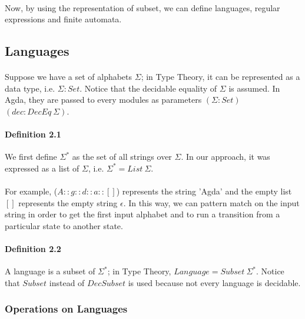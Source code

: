 \paragraph{}

\paragraph{} Now, by using the representation of subset, we can define languages, regular expressions and finite
automata. 

\subsection{Languages}

\paragraph{} Suppose we have a set of alphabets \(\Sigma\); in Type Theory, it
can be represented as a data type, i.e. \(\Sigma : Set\). Notice that the decidable equality of
\(\Sigma\) is assumed. In Agda, they are passed to every modules as
parameters \((\Sigma : Set)\) \((dec : DecEq\ \Sigma)\). 

\paragraph{Definition 2.1} We first define \(\Sigma^*\) as the set of all
strings over \(\Sigma\). In our approach, it was expressed as a list of
\(\Sigma\), i.e. \(\Sigma^* = List\ \Sigma\). 

\paragraph{} For example, (\(A :: g ::
d :: a :: []\)) represents the string 'Agda' and the empty list \([]\)
represents the empty string \(\epsilon\). In this way, we can pattern
match on the input string in order to get the first
input alphabet and to run a transition from a particular state to another state. 

\paragraph{Definition 2.2} A language is a subset of 
\(\Sigma^*\); in Type Theory, \(Language = Subset\ \Sigma^*\). 
Notice that \(Subset\) instead of \(DecSubset\) is used because not every language is decidable. 

\subsubsection{Operations on Languages}

